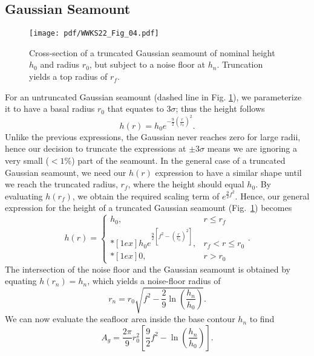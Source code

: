 \subsection{Gaussian Seamount}

\begin{figure}
\centering
\texttt{[image: pdf/WWKS22\_Fig\_04.pdf]}
\caption{Cross-section of a truncated Gaussian seamount of nominal height $h_0$ and radius
$r_0$, but subject to a noise floor at $h_n$.  Truncation yields a top radius of $r_f$.}
\label{WWKS22_Fig_04}
\end{figure}

For an untruncated Gaussian seamount (dashed line in Fig. \ref{WWKS22_Fig_04}), we parameterize it to have
a basal radius $r_0$ that equates to $3\sigma$; thus the height follows
\begin{equation*}
h(r) = h_0 e^{-\frac{9}{2} \left (\frac{r}{r_0} \right)^2}.
\end{equation*}
Unlike the previous expressions, the Gaussian never reaches zero for large radii, hence our decision to
truncate the expressions at $\pm3\sigma$ means we are ignoring a very small ($<1$\%) part of the seamount.
In the general case of a truncated Gaussian seamount, we need our $h(r)$ expression to have a similar
shape until we reach the truncated radius, $r_f$, where the height should equal $h_0$.
By evaluating $h(r_f)$, we obtain the required scaling term of $e^{\frac{9}{2}f^2}$.
Hence, our general expression for the height of a truncated Gaussian seamount (Fig.~\ref{WWKS22_Fig_04}) becomes
\begin{equation*}
h(r) = \left \{ \begin{array}{cl}
	h_0, &	r \leq r_f \\*[1ex]
	\displaystyle h_0 e^{\frac{9}{2} \left [ f^2 - \left (\frac{r}{r_0} \right )^2 \right ]}, & r_f < r \leq r_0 \\*[1ex]
	0, & r > r_0
\end{array} \right..
\end{equation*}
The intersection of the noise floor and the Gaussian seamount is obtained by equating $h(r_n) = h_n$,
which yields a noise-floor radius of
\begin{equation*}
r_n = r_0 \sqrt{f^2 - \frac{2}{9} \ln{\left (\frac{h_n}{h_0} \right )}}.
\end{equation*}
We can now evaluate the seafloor area inside the base contour $h_n$ to find
\begin{equation}
A_g = \frac{2\pi}{9} r_0^2 \left [ \frac{9}{2}f^2  - \ln{\left( \frac{h_n}{h_0} \right )} \right ].
\end{equation}

